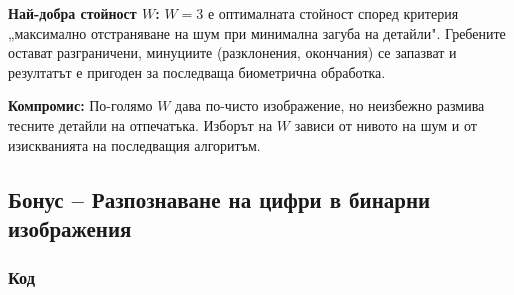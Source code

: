 \textbf{Най-добра стойност $W$:} $W=3$ е оптималната стойност според критерия „максимално отстраняване на шум при минимална загуба на детайли". Гребените остават разграничени, минуциите (разклонения, окончания) се запазват и резултатът е пригоден за последваща биометрична обработка.

\textbf{Компромис:} По-голямо $W$ дава по-чисто изображение, но неизбежно размива тесните детайли на отпечатъка. Изборът на $W$ зависи от нивото на шум и от изискванията на последващия алгоритъм.

\subsection{Бонус – Разпознаване на цифри в бинарни изображения}

\subsubsection{Код}

